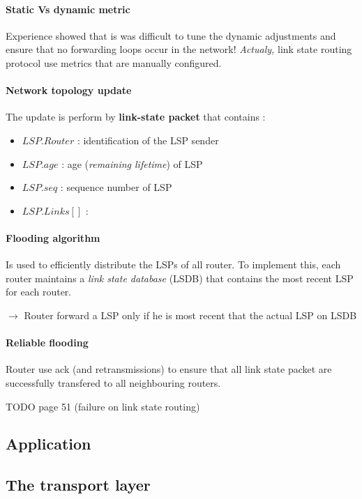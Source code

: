 \paragraph{Static Vs dynamic metric} Experience showed that is was difficult
to tune the dynamic adjustments and ensure that no forwarding loops occur in
the network! \textit{Actualy,} link state routing protocol use metrics
that are manually configured.

\paragraph{Network topology update}
The update is perform by \textbf{link-state packet} that contains :
\begin{itemize}
    \item $LSP.Router$ : identification of the LSP sender
    \item $LSP.age$ : age (\textit{remaining lifetime}) of LSP
    \item $LSP.seq$ : sequence number of LSP
    \item $LSP.Links[]$ : 
\end{itemize}

\paragraph{\textbf{Flooding} algorithm}
Is used to efficiently distribute the LSPs of all router.
To implement this, each router maintains a \textit{link state database} (LSDB) that
contains the most recent LSP for each router. 

$\to$ Router forward a LSP only if he is most recent that the actual LSP on LSDB

\paragraph{\textbf{Reliable flooding}} Router use ack (and retransmissions) to ensure that
all link state packet are successfully transfered to all neighbouring routers.

TODO page 51 (failure on link state routing)

\subsection{Application}


\subsection{The transport layer}

